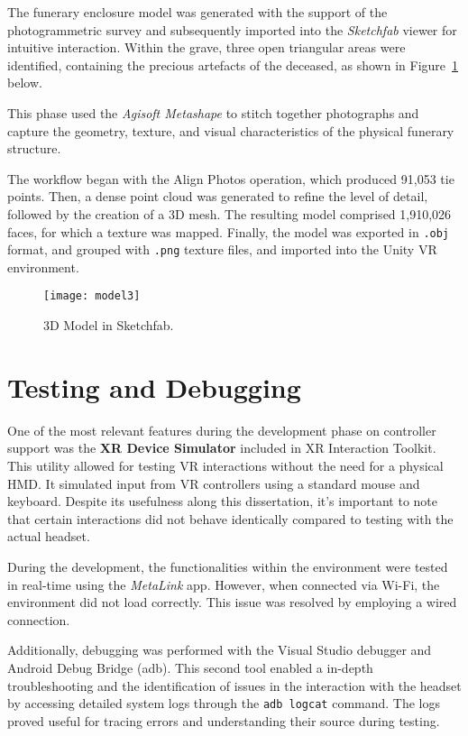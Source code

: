 The funerary enclosure model was generated with the support of the photogrammetric survey and subsequently imported into the \textit{Sketchfab} viewer for intuitive interaction.
Within the grave, three open triangular areas were identified, containing the precious artefacts of the deceased, as shown in Figure~\ref{fig:model3} below.

This phase used the \textit{Agisoft Metashape} to stitch together photographs and capture the geometry, texture, and visual characteristics of the physical funerary structure.

The workflow began with the Align Photos operation, which produced 91,053 tie points. Then, a dense point cloud was generated to refine the level of detail, followed by the creation of a \gls{3D} mesh. The resulting model comprised 1,910,026 faces, for which a texture was mapped.
Finally, the model was exported in \texttt{.obj} format, and grouped with \texttt{.png} texture files, and imported into the Unity \gls{VR} environment.

\begin{figure}[h!]
    \centering
    \texttt{[image: model3]}
    \caption{\gls{3D} Model in Sketchfab.}
    \label{fig:model3}
\end{figure}

\section{Testing and Debugging}
\label{sec:testing}

One of the most relevant features during the development phase on controller support was the \textbf{XR Device Simulator} included in XR Interaction Toolkit. 
This utility allowed for testing \gls{VR} interactions without the need for a physical \gls{HMD}. 
It simulated input from \gls{VR} controllers using a standard mouse and keyboard. 
Despite its usefulness along this dissertation, it's important to note that certain interactions did not behave identically compared to testing with the actual headset.

During the development, the functionalities within the environment were tested in real-time using the \emph{MetaLink} app. However, when connected via Wi-Fi, the environment did not load correctly. This issue was resolved by employing a wired connection.

Additionally, debugging was performed with the Visual Studio debugger and Android Debug Bridge (adb). 
This second tool enabled a in-depth troubleshooting and the identification of issues in the interaction with the headset by accessing detailed system logs through the \texttt{adb logcat} command. The logs proved useful for tracing errors and understanding their source during testing.


